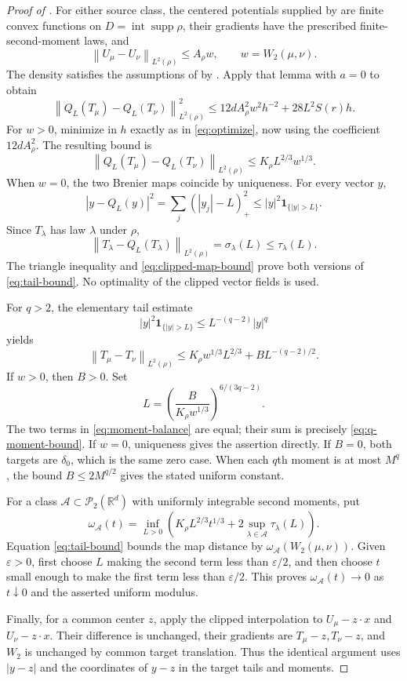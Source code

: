 \documentclass[11pt]{article}
\numberwithin{equation}{section}
\theoremstyle{remark}
\newcommand{\R}{\mathbb R}
\newcommand{\Prob}{\mathcal P}
\newcommand{\supp}{\operatorname{supp}}
\newcommand{\ind}{\mathbf 1}
\newcommand{\interior}{\operatorname{int}}
\newcommand{\norm}[1]{\left\lVert #1\right\rVert}
\begin{document}
\begin{proof}[Proof of ]
For either source class, the centered potentials supplied by  are finite convex functions on $D=\interior\supp\rho$, their gradients have the prescribed finite-second-moment laws, and
\[
 \norm{U_\mu-U_\nu}_{L^2(\rho)}\le A_\rho w,
 \qquad w=W_2(\mu,\nu).
\]
The density satisfies the assumptions of  by . Apply that lemma with $a=0$ to obtain
\[
 \norm{Q_L(T_\mu)-Q_L(T_\nu)}_{L^2(\rho)}^2
 \le 12dA_\rho^2w^2h^{-2}+28L^2S(r)h.
\]
For $w>0$, minimize in $h$ exactly as in \eqref{eq:optimize}, now using the coefficient $12dA_\rho^2$. The resulting bound is
\begin{equation}\label{eq:clipped-map-bound}
 \norm{Q_L(T_\mu)-Q_L(T_\nu)}_{L^2(\rho)}
 \le K_\rho L^{2/3}w^{1/3}.
\end{equation}
When $w=0$, the two Brenier maps coincide by uniqueness. For every vector $y$,
\[
 |y-Q_L(y)|^2=\sum_j(|y_j|-L)_+^2
 \le |y|^2\ind_{\{|y|>L\}}.
\]
Since $T_\lambda$ has law $\lambda$ under $\rho$,
\[
 \norm{T_\lambda-Q_L(T_\lambda)}_{L^2(\rho)}
 =\sigma_\lambda(L)\le\tau_\lambda(L).
\]
The triangle inequality and \eqref{eq:clipped-map-bound} prove both versions of \eqref{eq:tail-bound}. No optimality of the clipped vector fields is used.

For $q>2$, the elementary tail estimate
\[
 |y|^2\ind_{\{|y|>L\}}\le L^{-(q-2)}|y|^q
\]
yields
\begin{equation}\label{eq:moment-balance}
 \norm{T_\mu-T_\nu}_{L^2(\rho)}
 \le K_\rho w^{1/3}L^{2/3}+B L^{-(q-2)/2}.
\end{equation}
If $w>0$, then $B>0$. Set
\[
 L=\left(\frac{B}{K_\rho w^{1/3}}\right)^{6/(3q-2)}.
\]
The two terms in \eqref{eq:moment-balance} are equal; their sum is precisely \eqref{eq:q-moment-bound}. If $w=0$, uniqueness gives the assertion directly. If $B=0$, both targets are $\delta_0$, which is the same zero case. When each $q$th moment is at most $M^q$, the bound $B\le2M^{q/2}$ gives the stated uniform constant.

For a class $\mathcal A\subset\Prob_2(\R^d)$ with uniformly integrable second moments, put
\[
 \omega_{\mathcal A}(t)=\inf_{L>0}
 \left(K_\rho L^{2/3}t^{1/3}
                   +2\sup_{\lambda\in\mathcal A}\tau_\lambda(L)\right).
\]
Equation \eqref{eq:tail-bound} bounds the map distance by
$\omega_{\mathcal A}(W_2(\mu,\nu))$. Given $\varepsilon>0$, first choose $L$ making the second term less than $\varepsilon/2$, and then choose $t$ small enough to make the first term less than $\varepsilon/2$. This proves $\omega_{\mathcal A}(t)\to0$ as $t\downarrow0$ and the asserted uniform modulus.

Finally, for a common center $z$, apply the clipped interpolation to
$U_\mu-z\cdot x$ and $U_\nu-z\cdot x$. Their difference is unchanged, their gradients are $T_\mu-z,T_\nu-z$, and $W_2$ is unchanged by common target translation. Thus the identical argument uses $|y-z|$ and the coordinates of $y-z$ in the target tails and moments.
\end{proof}
\end{document}
